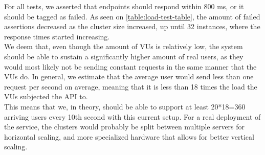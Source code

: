 For all tests, we asserted that endpoints should respond within 800 ms, or it should be tagged as failed.
As seen on \autoref{table:load-test-table}, the amount of failed assertions decreased as the cluster size increased, up until 32 instances, where the response times started increasing.
\\
We deem that, even though the amount of VUs is relatively low, the system should be able to sustain a significantly higher amount of real users, as they would most likely not be sending constant requests in the same manner that the VUs do.
In general, we estimate that the average user would send less than one request per second on average, meaning that it is less than 18 times the load the VUs subjected the API to.
\\
This means that we, in theory, should be able to support at least 20*18=360 arriving users every 10th second with this current setup.
For a real deployment of the service, the clusters would probably be split between multiple servers for horizontal scaling, and more specialized hardware that allows for better vertical scaling.
